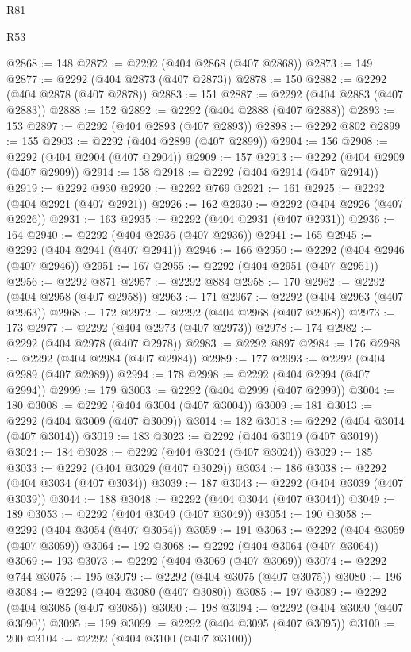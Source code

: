 \begin{lexlean}{R81}
\begin{lexlean}{R53}
\begin{coremodule}
{{{{{{{{{{{{{{{{{{{{{{{{{{{{{{{{{{{{{{{{{{{{{{{{{{{{{{{{{{{{{{{{{{{{{{{{{{{{{{{{{{{{{{{{{{{{{{{{{{{{{{{{{{{{{{{{@2868 := 148
@2872 := @2292 (@404 @2868 (@407 @2868))
@2873 := 149
@2877 := @2292 (@404 @2873 (@407 @2873))
@2878 := 150
@2882 := @2292 (@404 @2878 (@407 @2878))
@2883 := 151
@2887 := @2292 (@404 @2883 (@407 @2883))
@2888 := 152
@2892 := @2292 (@404 @2888 (@407 @2888))
@2893 := 153
@2897 := @2292 (@404 @2893 (@407 @2893))
@2898 := @2292 @802
@2899 := 155
@2903 := @2292 (@404 @2899 (@407 @2899))
@2904 := 156
@2908 := @2292 (@404 @2904 (@407 @2904))
@2909 := 157
@2913 := @2292 (@404 @2909 (@407 @2909))
@2914 := 158
@2918 := @2292 (@404 @2914 (@407 @2914))
@2919 := @2292 @930
@2920 := @2292 @769
@2921 := 161
@2925 := @2292 (@404 @2921 (@407 @2921))
@2926 := 162
@2930 := @2292 (@404 @2926 (@407 @2926))
@2931 := 163
@2935 := @2292 (@404 @2931 (@407 @2931))
@2936 := 164
@2940 := @2292 (@404 @2936 (@407 @2936))
@2941 := 165
@2945 := @2292 (@404 @2941 (@407 @2941))
@2946 := 166
@2950 := @2292 (@404 @2946 (@407 @2946))
@2951 := 167
@2955 := @2292 (@404 @2951 (@407 @2951))
@2956 := @2292 @871
@2957 := @2292 @884
@2958 := 170
@2962 := @2292 (@404 @2958 (@407 @2958))
@2963 := 171
@2967 := @2292 (@404 @2963 (@407 @2963))
@2968 := 172
@2972 := @2292 (@404 @2968 (@407 @2968))
@2973 := 173
@2977 := @2292 (@404 @2973 (@407 @2973))
@2978 := 174
@2982 := @2292 (@404 @2978 (@407 @2978))
@2983 := @2292 @897
@2984 := 176
@2988 := @2292 (@404 @2984 (@407 @2984))
@2989 := 177
@2993 := @2292 (@404 @2989 (@407 @2989))
@2994 := 178
@2998 := @2292 (@404 @2994 (@407 @2994))
@2999 := 179
@3003 := @2292 (@404 @2999 (@407 @2999))
@3004 := 180
@3008 := @2292 (@404 @3004 (@407 @3004))
@3009 := 181
@3013 := @2292 (@404 @3009 (@407 @3009))
@3014 := 182
@3018 := @2292 (@404 @3014 (@407 @3014))
@3019 := 183
@3023 := @2292 (@404 @3019 (@407 @3019))
@3024 := 184
@3028 := @2292 (@404 @3024 (@407 @3024))
@3029 := 185
@3033 := @2292 (@404 @3029 (@407 @3029))
@3034 := 186
@3038 := @2292 (@404 @3034 (@407 @3034))
@3039 := 187
@3043 := @2292 (@404 @3039 (@407 @3039))
@3044 := 188
@3048 := @2292 (@404 @3044 (@407 @3044))
@3049 := 189
@3053 := @2292 (@404 @3049 (@407 @3049))
@3054 := 190
@3058 := @2292 (@404 @3054 (@407 @3054))
@3059 := 191
@3063 := @2292 (@404 @3059 (@407 @3059))
@3064 := 192
@3068 := @2292 (@404 @3064 (@407 @3064))
@3069 := 193
@3073 := @2292 (@404 @3069 (@407 @3069))
@3074 := @2292 @744
@3075 := 195
@3079 := @2292 (@404 @3075 (@407 @3075))
@3080 := 196
@3084 := @2292 (@404 @3080 (@407 @3080))
@3085 := 197
@3089 := @2292 (@404 @3085 (@407 @3085))
@3090 := 198
@3094 := @2292 (@404 @3090 (@407 @3090))
@3095 := 199
@3099 := @2292 (@404 @3095 (@407 @3095))
@3100 := 200
@3104 := @2292 (@404 @3100 (@407 @3100))
}}}}}}}}}}}}}}}}}}}}}}}}}}}}}}}}}}}}}}}}}}}}}}}}}}}}}}}}}}}}}}}}}}}}}}}}}}}}}}}}}}}}}}}}}}}}}}}}}}}}}}}}}}}}}}}}
\end{coremodule}
\end{lexlean}
\end{lexlean}

